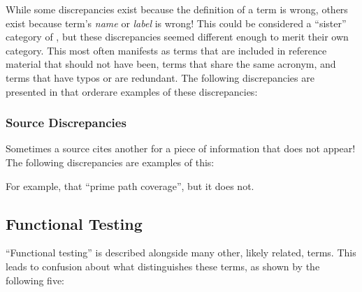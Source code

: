 While some discrepancies exist because the definition of a term is wrong,
others exist because term's \emph{name} or \emph{label} is wrong! This could be
considered a ``sister'' category of , but these
discrepancies seemed different enough to merit their own category. \ifnotpaper
    This most often manifests as terms that are included in reference material
    that should not have been, terms that share the same acronym, and terms
    that have typos or are redundant. \fi The following \ifnotpaper
    discrepancies are presented in that order\else are examples of these
    discrepancies\fi:



\subsubsection{Source Discrepancies}
\label{srcs}

Sometimes a source cites another for a piece of information that does not
appear! \ifnotpaper
    The following discrepancies are examples of this:
    
\else
    For example, \citet[p.~184]{DoğanEtAl2014}  that
    \citet{SakamotoEtAl2013}  ``prime path coverage'',
    but it does not.
\fi


\subsection{Functional Testing}
\label{func-test-discrep}

``Functional testing'' is described alongside many other, likely related,
terms. This leads to confusion about what distinguishes these terms, as shown
by the following five:

